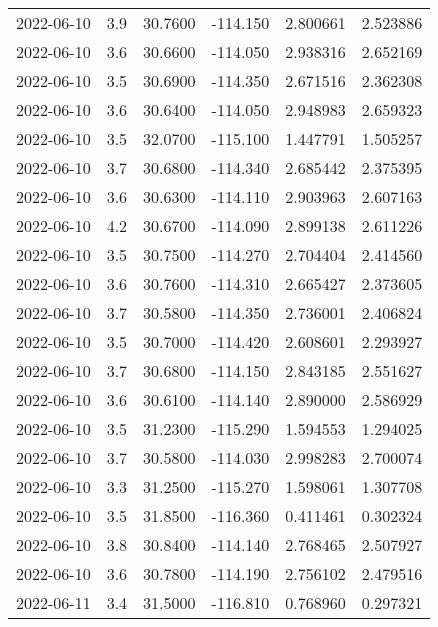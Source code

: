\begin{tabular}{lrrrrr}
2022-06-10 &       3.9 &  30.7600 &  -114.150 &         2.800661 &         2.523886 \\
2022-06-10 &       3.6 &  30.6600 &  -114.050 &         2.938316 &         2.652169 \\
2022-06-10 &       3.5 &  30.6900 &  -114.350 &         2.671516 &         2.362308 \\
2022-06-10 &       3.6 &  30.6400 &  -114.050 &         2.948983 &         2.659323 \\
2022-06-10 &       3.5 &  32.0700 &  -115.100 &         1.447791 &         1.505257 \\
2022-06-10 &       3.7 &  30.6800 &  -114.340 &         2.685442 &         2.375395 \\
2022-06-10 &       3.6 &  30.6300 &  -114.110 &         2.903963 &         2.607163 \\
2022-06-10 &       4.2 &  30.6700 &  -114.090 &         2.899138 &         2.611226 \\
2022-06-10 &       3.5 &  30.7500 &  -114.270 &         2.704404 &         2.414560 \\
2022-06-10 &       3.6 &  30.7600 &  -114.310 &         2.665427 &         2.373605 \\
2022-06-10 &       3.7 &  30.5800 &  -114.350 &         2.736001 &         2.406824 \\
2022-06-10 &       3.5 &  30.7000 &  -114.420 &         2.608601 &         2.293927 \\
2022-06-10 &       3.7 &  30.6800 &  -114.150 &         2.843185 &         2.551627 \\
2022-06-10 &       3.6 &  30.6100 &  -114.140 &         2.890000 &         2.586929 \\
2022-06-10 &       3.5 &  31.2300 &  -115.290 &         1.594553 &         1.294025 \\
2022-06-10 &       3.7 &  30.5800 &  -114.030 &         2.998283 &         2.700074 \\
2022-06-10 &       3.3 &  31.2500 &  -115.270 &         1.598061 &         1.307708 \\
2022-06-10 &       3.5 &  31.8500 &  -116.360 &         0.411461 &         0.302324 \\
2022-06-10 &       3.8 &  30.8400 &  -114.140 &         2.768465 &         2.507927 \\
2022-06-10 &       3.6 &  30.7800 &  -114.190 &         2.756102 &         2.479516 \\
2022-06-11 &       3.4 &  31.5000 &  -116.810 &         0.768960 &         0.297321 \\

\end{tabular}

